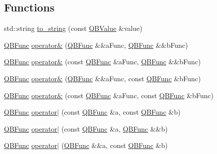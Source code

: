 \subsection*{Functions}
\begin{DoxyCompactItemize}
\item 
std\+::string \hyperlink{namespaceQuickMath_adcde5647f1e74097d4cc15106b49c97f}{to\+\_\+string} (const \hyperlink{namespaceQuickMath_aec13b08c42d9f8e688241623c8b379a0}{Q\+B\+Value} \&value)
\item 
\hyperlink{classQuickMath_1_1QBFunc}{Q\+B\+Func} \hyperlink{namespaceQuickMath_a51be6b3860bbe4b1c805802a75672d6b}{operator\&} (\hyperlink{classQuickMath_1_1QBFunc}{Q\+B\+Func} \&\&a\+Func, \hyperlink{classQuickMath_1_1QBFunc}{Q\+B\+Func} \&\&b\+Func)
\item 
\hyperlink{classQuickMath_1_1QBFunc}{Q\+B\+Func} \hyperlink{namespaceQuickMath_a9d86ec2c8ce2e677a3772139b55c5eb2}{operator\&} (const \hyperlink{classQuickMath_1_1QBFunc}{Q\+B\+Func} \&a\+Func, \hyperlink{classQuickMath_1_1QBFunc}{Q\+B\+Func} \&\&b\+Func)
\item 
\hyperlink{classQuickMath_1_1QBFunc}{Q\+B\+Func} \hyperlink{namespaceQuickMath_aad0ba758a291025de40b18759253502b}{operator\&} (\hyperlink{classQuickMath_1_1QBFunc}{Q\+B\+Func} \&\&a\+Func, const \hyperlink{classQuickMath_1_1QBFunc}{Q\+B\+Func} \&b\+Func)
\item 
\hyperlink{classQuickMath_1_1QBFunc}{Q\+B\+Func} \hyperlink{namespaceQuickMath_a91a302f63284f69e0c8488e23ee15149}{operator\&} (const \hyperlink{classQuickMath_1_1QBFunc}{Q\+B\+Func} \&a\+Func, const \hyperlink{classQuickMath_1_1QBFunc}{Q\+B\+Func} \&b\+Func)
\item 
\hyperlink{classQuickMath_1_1QBFunc}{Q\+B\+Func} \hyperlink{namespaceQuickMath_abc8953024e3f3991254a9515fa10613d}{operator$\vert$} (const \hyperlink{classQuickMath_1_1QBFunc}{Q\+B\+Func} \&a, const \hyperlink{classQuickMath_1_1QBFunc}{Q\+B\+Func} \&b)
\item 
\hyperlink{classQuickMath_1_1QBFunc}{Q\+B\+Func} \hyperlink{namespaceQuickMath_aaea2b21bcf489eba1734f2fc3a1828c7}{operator$\vert$} (const \hyperlink{classQuickMath_1_1QBFunc}{Q\+B\+Func} \&a, \hyperlink{classQuickMath_1_1QBFunc}{Q\+B\+Func} \&\&b)
\item 
\hyperlink{classQuickMath_1_1QBFunc}{Q\+B\+Func} \hyperlink{namespaceQuickMath_a97f0c0525486f9a75a9bf7b8e43a5611}{operator$\vert$} (\hyperlink{classQuickMath_1_1QBFunc}{Q\+B\+Func} \&\&a, const \hyperlink{classQuickMath_1_1QBFunc}{Q\+B\+Func} \&b)
\item 

\end{DoxyCompactItemize}

